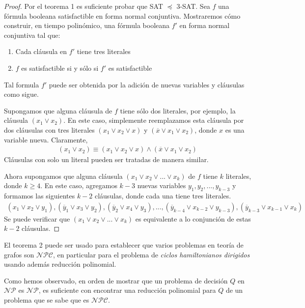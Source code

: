 \documentclass{article}
\begin{document}
\begin{proof}
Por el teorema 1
es suficiente probar que SAT $\preceq$ 3-SAT. Sea $f$ una
fórmula booleana satisfactible en forma normal conjuntiva.
Mostraremos cómo construir, en tiempo polinómico, una
fórmula booleana $f'$ en forma normal conjuntiva tal que:
\begin{enumerate}
\item Cada cláusula en $f'$ tiene tres literales
\item $f$ es satisfactible si y sólo si $f'$ es satisfactible
\end{enumerate}
\noindent Tal formula $f'$ puede ser obtenida por la adición
de nuevas variables y cláusulas como sigue.

Supongamos que alguna cláusula de $f$ tiene sólo dos literales,
por ejemplo, la cláusula $(x_1 \vee x_2)$. En este caso,
simplemente reemplazamos esta cláusula por dos cláusulas con
tres literales $(x_1 \vee x_2 \vee x)$ y 
$(\overline{x} \vee x_1 \vee x_2)$, donde $x$ es una variable
nueva. Claramente,
\begin{align*}
    (x_1 \vee x_2) \equiv (x_1 \vee x_2 \vee x) \land
    (\overline{x} \vee x_1 \vee x_2)
\end{align*}
Cláusulas con solo un literal pueden ser tratadas de manera similar.

Ahora supongamos que alguna cláusula 
$(x_1 \vee x_2 \vee ... \vee x_k)$ de $f$ tiene $k$ literales, donde
$k \geq 4$. En este caso, agregamos $k-3$ nuevas variables
$y_1,y_2,...,y_{k-3}$ y formamos las siguientes $k-2$ cláusulas,
donde cada una tiene tres literales.
\begin{align*}
    (x_1 \vee x_2 \vee y_1), (\overline{y}_1 \vee x_3 \vee y_2),
    (\overline{y}_2 \vee x_4 \vee y_3),..., 
    (\overline{y}_{k-4} \vee x_{k-2} \vee y_{k-3}),
    (\overline{y}_{k-3} \vee x_{k-1} \vee x_k)
\end{align*}
Se puede verificar que $(x_1 \vee x_2 \vee ... \vee x_k)$ es
equivalente a lo conjunción de estas $k-2$ cláusulas.
\end{proof}

El teorema 2 puede ser usado para establecer que varios
problemas en teoría de grafos son $\mathcal{NPC}$, en particular
para el problema de \textit{ciclos hamiltonianos dirigidos}
usando además reducción polinomial.

Como hemos observado, en orden de mostrar que un problema
de decisión $Q$ en $\mathcal{NP}$ es $\mathcal{NP}$, es 
suficiente con encontrar una reducción polinomial para $Q$ de un
problema que se sabe que es $\mathcal{NPC}$.
\end{document}
